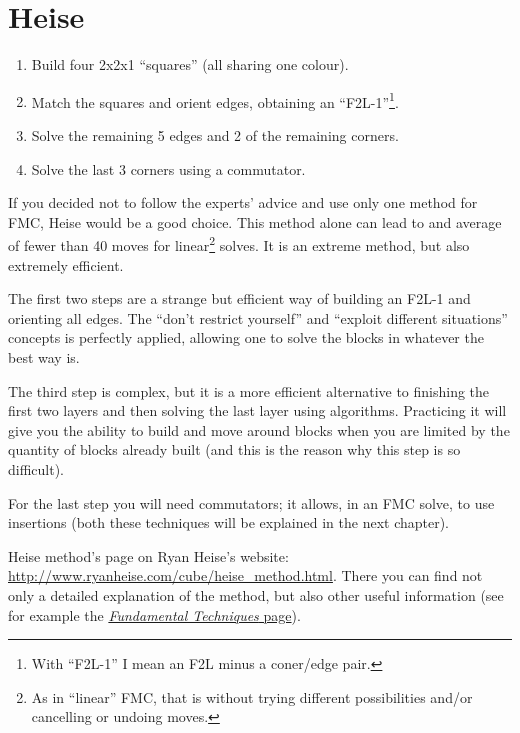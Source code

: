 \documentclass[11pt,a4paper]{book}
\begin{document}
\section{Heise}
\begin{enumerate}
\item Build four 2x2x1 ``squares'' (all sharing one colour).
\item Match the squares and orient edges, obtaining an ``F2L-1''\footnote{With ``F2L-1'' I mean an F2L minus a coner/edge pair.}.
\item Solve the remaining 5 edges and 2 of the remaining corners.
\item Solve the last 3 corners using a commutator.
\end{enumerate}

If you decided not to follow the experts' advice and use only one method for FMC, Heise would be a good choice. This method alone can lead to and average of fewer than 40 moves for linear\footnote{As in ``linear'' FMC, that is without trying different possibilities and/or cancelling or undoing moves.} solves. It is an extreme method, but also extremely efficient.

The first two steps are a strange but efficient way of building an F2L-1 and orienting all edges. The ``don't restrict yourself'' and ``exploit different situations'' concepts is perfectly applied, allowing one to solve the blocks in whatever the best way is.

The third step is complex, but it is a more efficient alternative to finishing the first two layers and then solving the last layer using algorithms. Practicing it will give you the ability to build and move around blocks when you are limited by the quantity of blocks already built (and this is the reason why this step is so difficult).

For the last step you will need commutators; it allows, in an FMC solve, to use insertions (both these techniques will be explained in the next chapter).

Heise method's page on Ryan Heise's website: \url{http://www.ryanheise.com/cube/heise_method.html}. There you can find not only a detailed explanation of the method, but also other useful information (see for example the \href{http://www.ryanheise.com/cube/fundamental_techniques.html}{\emph{Fundamental Techniques} page}).
\end{document}
